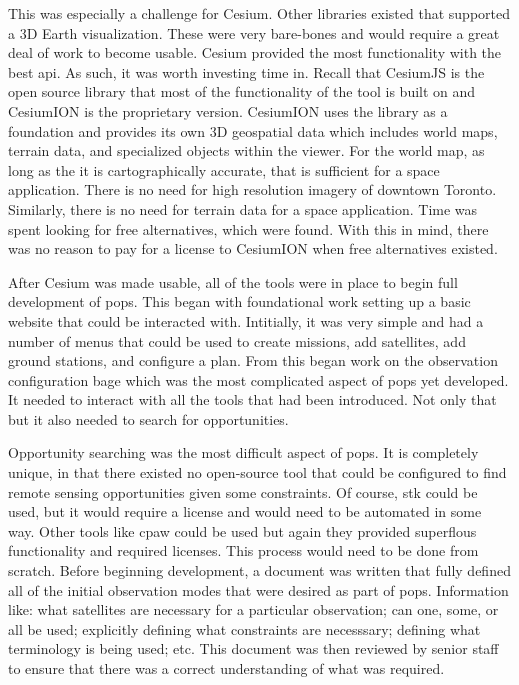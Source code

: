 This was especially a challenge for Cesium. Other libraries existed that
supported a 3D Earth visualization. These were very bare-bones and would
require a great deal of work to become usable. Cesium provided the most
functionality with the best \gls{api}. As such, it was worth investing time in.
Recall that CesiumJS is the open source library that most of the functionality
of the tool is built on and CesiumION is the proprietary version.  CesiumION
uses the library as a foundation and provides its own 3D geospatial data which
includes world maps, terrain data, and specialized objects within the viewer.
For the world map, as long as the it is cartographically accurate, that is
sufficient for a space application.  There is no need for high resolution
imagery of downtown Toronto.  Similarly, there is no need for terrain data for
a space application. Time was spent looking for free alternatives, which were
found.  With this in mind, there was no reason to pay for a license to
CesiumION when free alternatives existed.

After Cesium was made usable, all of the tools were in place to begin full
development of \gls{pops}. This began with foundational work setting up a basic
website that could be interacted with. Intitially, it was very simple and had a
number of menus that could be used to create missions, add satellites, add
ground stations, and configure a plan. From this began work on the observation
configuration bage which was the most complicated aspect of \gls{pops} yet
developed. It needed to interact with all the tools that had been introduced.
Not only that but it also needed to search for opportunities.

Opportunity searching was the most difficult aspect of \gls{pops}. It is
completely unique, in that there existed no open-source tool that could be
configured to find remote sensing opportunities given some constraints. Of
course, \gls{stk} could be used, but it would require a license and would need
to be automated in some way. Other tools like \gls{cpaw} could be used but
again they provided superflous functionality and required licenses. This
process would need to be done from scratch. Before beginning development, a
document was written that fully defined all of the initial observation modes
that were desired as part of \gls{pops}. Information like: what satellites are
necessary for a particular observation; can one, some, or all be used;
explicitly defining what constraints are necesssary; defining what terminology
is being used; etc. This document was then reviewed by senior staff to ensure
that there was a correct understanding of what was required.


